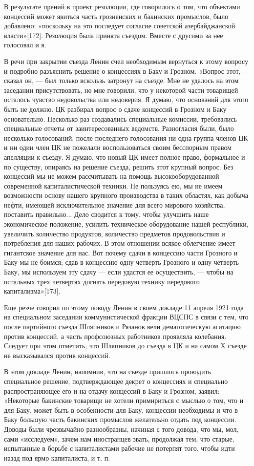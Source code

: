 \documentclass[12pt, a4paper, openany]{book}
\begin{document}
В результате прений в проект резолюции, где говорилось о том, что объектами концессий может явиться часть грозненских и бакинских промыслов, было добавлено: «поскольку на это последует согласие советской азербайджанской власти»[172]. Резолюция была принята съездом. Вместе с другими за нее голосовал и я.

В речи при закрытии съезда Ленин счел необходимым вернуться к этому вопросу и подробно разъяснить решение о концессиях в Баку и Грозном. «Вопрос этот, — сказал он, — был только вскользь затронут на съезде. Мне не удалось на этом заседании присутствовать, но мне говорили, что у некоторой части товарищей осталось чувство недовольства или недоверия. Я думаю, что оснований для этого быть не должно. ЦК разбирал вопрос о сдаче концессий в Грозном и Баку основательно. Несколько раз создавались специальные комиссии, требовались специальные отчеты от заинтересованных ведомств. Разногласия были, было несколько голосований, после последнего голосования ни одна группа членов ЦК и ни один член ЦК не пожелали воспользоваться своим бесспорным правом апелляции к съезду. Я думаю, что новый ЦК имеет полное право, формальное и по существу, опираясь на решение съезда, решить этот крупный вопрос. Без концессий мы не можем рассчитывать на помощь высокооборудованной современной капиталистической техники. Не пользуясь ею, мы не имеем возможности основу нашего крупного производства в таких областях, как добыча нефти, имеющей исключительное значение для всего мирового хозяйства, поставить правильно... Дело сводится к тому, чтобы улучшить наше экономическое положение, усилить техническое оборудование нашей республики, увеличить количество продуктов, количество предметов продовольствия и потребления для наших рабочих. В этом отношении всякое облегчение имеет гигантское значение для нас. Вот почему сдачи в концессию части Грозного и Баку мы не боимся; сдав в концессию одну четверть Грозного и одну четверть Баку, мы используем эту сдачу — если удастся ее осуществить, — чтобы на остальных трех четвертях догнать передовую технику передового капитализма»[173].

Еще резче говорил по этому поводу Ленин в своем докладе 11 апреля 1921 года на специальном заседании коммунистической фракции ВЦСПС в связи с тем, что после партийного съезда Шляпников и Рязанов вели демагогическую агитацию против концессий, а часть профсоюзных работников проявляла колебания. Следует при этом отметить, что Шляпников до съезда в ЦК и на самом X съезде не высказывался против концессий.

В этом докладе Ленин, напомнив, что на съезде пришлось проводить специальное решение, подтверждающее декрет о концессиях и специально распространяющее его и на отдачу концессий в Баку и Грозном, заявил: «Некоторые бакинские товарищи не хотели примириться с мыслью о том, что и для Баку, может быть в особенности для Баку, концессии необходимы и что в Баку большую часть бакинских промыслов желательно отдать под концессии. Доводы были чрезвычайно разнообразны, начиная с того довода, что мы, мол, сами «исследуем», зачем нам иностранцев звать, продолжая тем, что старые, испытанные в борьбе с капиталистами рабочие не потерпят того, чтобы идти назад под ярмо капиталиста, и т. п.
\end{document}
